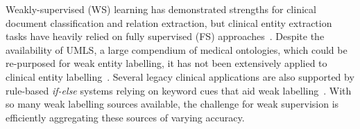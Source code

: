 \documentclass[10.7pt,]{article}
\begin{document}
Weakly-supervised (WS) learning has demonstrated strengths for clinical document classification and relation extraction, but clinical entity extraction tasks have heavily relied on fully supervised (FS) approaches~\cite{meng2018weakly,wang2019clinical,mintz2009distant,elangovan2020assigning,weber2020pedl,mallory2020extracting}.
Despite the availability of UMLS, a large compendium of medical ontologies, which could be re-purposed for weak entity labelling, it has not been extensively applied to clinical entity labelling~\cite{humphreys1998unified}.
Several legacy clinical applications are also supported by rule-based \textit{if-else} systems relying on keyword cues that aid weak labelling~\cite{friedlin2008software,kim2017extracting,yang2015automatic}.
With so many weak labelling sources available, the challenge for weak supervision is efficiently aggregating these sources of varying accuracy.
\end{document}
